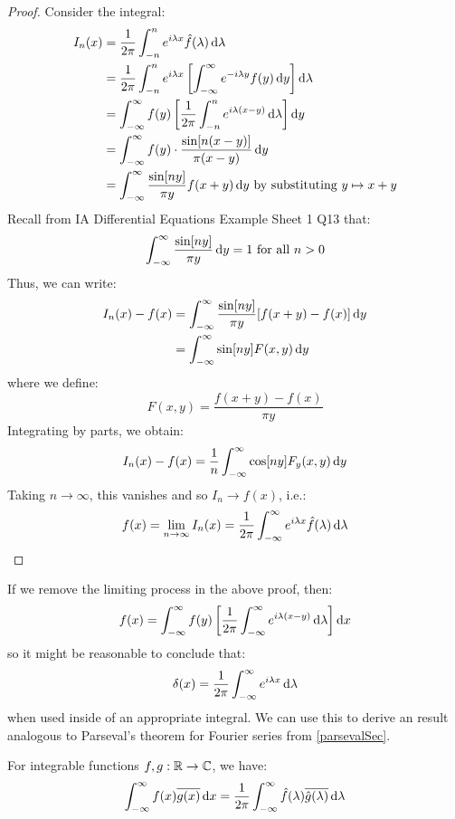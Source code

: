 \documentclass[../main.tex]{subfiles}
\begin{document}
\begin{proof}
  Consider the integral:
  \begin{align*}
    I_n(x) &= \frac{1}{2\pi} \int_{-n}^{n} e^{i \lambda x} \hat{f}(\lambda) \d{\lambda} \\
           &= \frac{1}{2\pi} \int_{-n}^{n} e^{i\lambda x} \left[\int_{-\infty}^{\infty} e^{-i\lambda y} f(y) \d{y}\right] \d{\lambda} \\
           &= \int_{-\infty}^{\infty} f(y) \left[\frac{1}{2\pi} \int_{-n}^{n} e^{i\lambda(x - y)} \d{\lambda}\right] \d{y} \\
           &= \int_{-\infty}^{\infty} f(y) \cdot \frac{\sin[n(x - y)]}{\pi(x - y)} \d{y} \\
           &= \int_{-\infty}^{\infty} \frac{\sin[ny]}{\pi y} f(x + y) \d{y} \text{ by substituting $y \mapsto x + y$}
  \end{align*}
  Recall from IA Differential Equations Example Sheet 1 Q13 that:
  \[
    \int_{-\infty}^{\infty} \frac{\sin[ny]}{\pi y} \d{y} = 1 \text{ for all } n > 0
  \]
  Thus, we can write:
  \begin{align*}
    I_n(x) - f(x) &= \int_{-\infty}^{\infty} \frac{\sin[ny]}{\pi y}[f(x + y) - f(x)] \d{y} \\
                  &= \int_{-\infty}^{\infty} \sin[ny] F(x, y) \d{y}
  \end{align*}
  where we define:
  \[
    F(x, y) = \frac{f(x + y) - f(x)}{\pi y}
  \]
  Integrating by parts, we obtain:
  \[
    I_n(x) - f(x) = \frac{1}{n} \int_{-\infty}^{\infty} \cos[ny] F_y(x, y) \d{y}
  \]
  Taking $n \to \infty$, this vanishes and so $I_n \to f(x)$, i.e.:
  \[
    f(x) = \lim_{n \to \infty} I_n(x) = \frac{1}{2\pi} \int_{-\infty}^{\infty} e^{i \lambda x} \hat{f}(\lambda) \d{\lambda}
  \]
\end{proof}
If we remove the limiting process in the above proof, then:
\[
  f(x) = \int_{-\infty}^{\infty} f(y) \left[\frac{1}{2\pi} \int_{-\infty}^{\infty} e^{i\lambda(x - y)} \d{\lambda}\right] \d{x}
\]
so it might be reasonable to conclude that:
\begin{equation}
  \delta(x) = \frac{1}{2\pi} \int_{-\infty}^{\infty} e^{i\lambda x} \d{\lambda} \label{deltaFormula}
\end{equation}
when used inside of an appropriate integral.
We can use this to derive an result analogous to Parseval's theorem for Fourier series from \cref{parsevalSec}.
\begin{proposition}
  For integrable functions $f, g: \mathbb{R} \to \mathbb{C}$, we have: \label{parseTrans}
  \[
    \int_{-\infty}^{\infty} f(x) \overline{g(x)} \d{x} = \frac{1}{2\pi} \int_{-\infty}^{\infty} \hat{f}(\lambda) \overline{\hat{g}(\lambda)} \d{\lambda}
  \]
\end{proposition}
\end{document}
